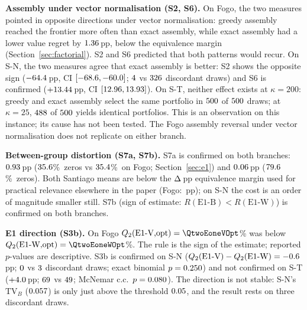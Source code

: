 \textbf{Assembly under vector normalisation (S2, S6).}
On Fogo, the two measures pointed in opposite directions under vector
normalisation: greedy assembly reached the frontier more often than exact
assembly, while exact assembly had a lower value regret by
$1.36$\,pp, below the equivalence margin
(Section~\ref{sec:factorial}).
S2 and S6 predicted that both patterns would recur.
On S-N, the two measures agree that exact assembly is better:
S2 shows the opposite sign ($-64.4$\,pp,
CI $[-68.6, -60.0]$;
$4$ vs $326$ discordant draws) and
S6 is confirmed ($+13.44$\,pp,
CI $[12.96, 13.93]$).
On S-T, neither effect exists at $\kappa=200$: greedy and exact assembly
select the same portfolio in $500$ of $500$
draws; at $\kappa=25$, $488$ of $500$
yields identical portfolios.
This is an observation on this instance; its cause has not been tested.
The Fogo assembly reversal under vector normalisation does not replicate
on either branch.

\textbf{Between-group distortion (S7a, S7b).}
S7a is confirmed on both branches: $0.93$\,pp
($35.6$\%\ zeros vs $35.4$\%\ on Fogo;
Section~\ref{sec:e1}) and $0.06$\,pp
($79.6$\%\ zeros).
Both Santiago means are below the $\Delta$\,pp equivalence
margin used for practical relevance elsewhere in the paper
(Fogo: \RegretEoneB\,pp); on S-N the cost is an order of magnitude
smaller still.
S7b (sign of estimate: $R(\text{E1-B}) < R(\text{E1-W})$) is confirmed
on both branches.

\textbf{E1 direction (S3b).}
On Fogo $Q_2(\text{E1-V,opt})=\QtwoEoneVOpt$\% was below
$Q_2(\text{E1-W,opt})=\QtwoEoneWOpt$\%.
The rule is the sign of the estimate; reported $p$-values are descriptive.
S3b is confirmed on S-N
($Q_2(\text{E1-V})-Q_2(\text{E1-W})=-0.6$\,pp;
$0$ vs $3$ discordant draws;
exact binomial $p=0.250$)
and not confirmed on S-T
($+4.0$\,pp; $69$ vs
$49$; McNemar c.c.\ $p=0.080$).
The direction is not stable: S-N's $\mathrm{TV}_B$ ($0.057$) is
only just above the threshold $0.05$, and the result rests on
three discordant draws.

